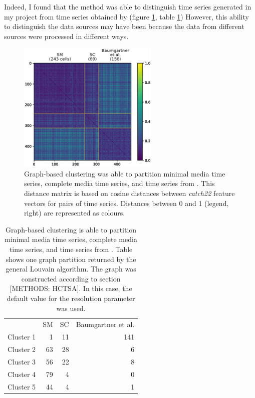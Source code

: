 Indeed, I found that the method was able to distinguish time series generated in my project from time series obtained by \citet{baumgartnerFlavinbasedMetabolicCycles2018} (figure \ref{fig:DistanceMatrixBaumgartner}, table \ref{tab:ClusterBaumgartner})
However, this ability to distinguish the data sources may have been because the data from different sources were processed in different ways.

\begin{figure}[htbp]
  \centering
  \includegraphics[width=0.6\textwidth]{10m_DistanceMatrixBaumgartner}
  \caption{Graph-based clustering was able to partition minimal media time series, complete media time series, and time series from \citet{baumgartnerFlavinbasedMetabolicCycles2018}.
    This distance matrix is based on cosine distances between \emph{catch22} feature vectors for pairs of time series.  Distances between 0 and 1 (legend, right) are represented as colours.}
  \label{fig:DistanceMatrixBaumgartner}
\end{figure}

\begin{table}[htbp]
  \centering
  \begin{tabular}[h]{rrrr}
    & SM & SC & Baumgartner et al.\\
    Cluster 1 & 1 & 11 & 141\\
    Cluster 2 & 63 & 28 & 6\\
    Cluster 3 & 56 & 22 & 8\\
    Cluster 4 & 79 & 4 & 0\\
    Cluster 5 & 44 & 4 & 1
  \end{tabular}
  \caption{Graph-based clustering is able to partition minimal media time series, complete media time series, and time series from \citet{baumgartnerFlavinbasedMetabolicCycles2018}.  Table shows one graph partition returned by the general Louvain algorithm.  The graph was constructed according to section [METHODS: HCTSA].  In this case, the default value for the resolution parameter was used.}
  \label{tab:ClusterBaumgartner}
\end{table}

